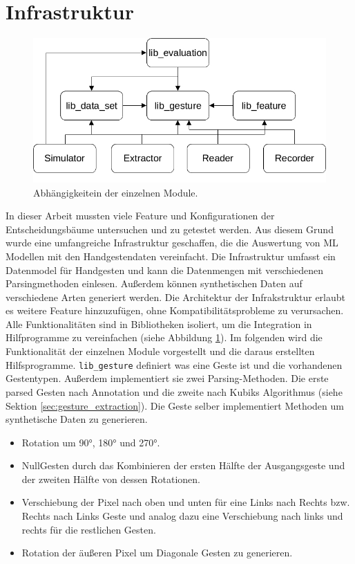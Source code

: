 \section{Infrastruktur}
\label{sec:recorder}
\begin{figure}
    \centering
    \includegraphics[width=0.75\linewidth]{images/architecture_overview.jpg}
    \caption{Abhängigkeitein der einzelnen Module.}
    \label{fig:architecture_overview}
\end{figure}
In dieser Arbeit mussten viele Feature und Konfigurationen der Entscheidungsbäume untersuchen und zu getestet werden. Aus diesem Grund wurde eine umfangreiche Infrastruktur geschaffen, die die
Auswertung von ML Modellen mit den Handgestendaten vereinfacht. Die Infrastruktur umfasst ein Datenmodel für Handgesten und kann die Datenmengen mit verschiedenen Parsingmethoden einlesen.
\newline
\newline
Außerdem können synthetischen Daten auf verschiedene Arten generiert werden. Die Architektur der Infrakstruktur erlaubt es weitere Feature hinzuzufügen, ohne Kompatibilitätsprobleme zu verursachen.
Alle Funktionalitäten sind in Bibliotheken isoliert, um die Integration in Hilfprogramme zu vereinfachen (siehe Abbildung \ref{fig:architecture_overview}).
\newline
\newline
Im folgenden wird die Funktionalität der einzelnen Module vorgestellt und die daraus erstellten Hilfsprogramme.
\newline
\newline
\texttt{lib\_gesture} definiert was eine Geste ist und die vorhandenen Gestentypen. Außerdem implementiert sie zwei Parsing-Methoden. Die erste parsed Gesten nach Annotation und die zweite nach Kubiks Algorithmus (siehe
Sektion \ref{sec:gesture_extraction}). Die Geste selber implementiert Methoden um synthetische Daten zu generieren.
\begin{itemize}
    \item Rotation um 90°, 180° und 270°.
    \item NullGesten durch das Kombinieren der ersten Hälfte der Ausgangsgeste und der zweiten Hälfte von dessen Rotationen.
    \item Verschiebung der Pixel nach oben und unten für eine Links nach Rechts bzw. Rechts nach Links Geste und analog dazu eine Verschiebung nach links und rechts für die restlichen Gesten.
    \item Rotation der äußeren Pixel um Diagonale Gesten zu generieren.
\end{itemize}
